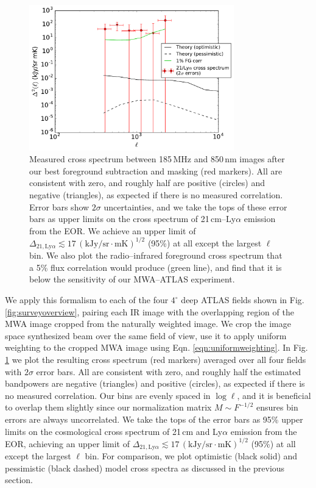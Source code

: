 \documentclass[numberedappendix]{emulateapj}
\begin{document}
\begin{figure}[h]
\centering
\includegraphics[width=3.5in]{images/mwa_atlas_xspec_with_2Dsimtheory_and_2sigma_errors_6bins.pdf}
\caption{Measured cross spectrum between 185\,MHz and 850\,nm images after our best foreground subtraction and masking (red markers). All are consistent with zero, and roughly half are positive (circles) and negative (triangles), as expected if there is no measured correlation. Error bars show $2\sigma$ uncertainties, and we take the tops of these error bars as upper limits on the cross spectrum of 21\,cm--Ly$\alpha$ emission from the EOR. We achieve an upper limit of $\Delta_{21,\text{Ly}\alpha}\lesssim17\,(\text{kJy/sr}\cdot \text{mK})^{1/2}$ (95\%) at all except the largest $\ell$ bin. We also plot the radio--infrared foreground cross spectrum that a 5\% flux correlation would produce (green line), and find that it is below the sensitivity of our MWA--ATLAS experiment.}
\label{fig:resxspec}
\end{figure}

We apply this formalism to each of the four $4^\circ$ deep ATLAS fields shown in Fig. \ref{fig:surveyoverview}, pairing each IR image with the overlapping region of the MWA image cropped from the naturally weighted image. We crop the image space synthesized beam over the same field of view, use it to apply uniform weighting to the cropped MWA image using Eqn. \ref{eqn:uniformweighting}. In Fig. \ref{fig:resxspec} we plot the resulting cross spectrum (red markers) averaged over all four fields with $2\sigma$ error bars. All are consistent with zero, and roughly half the estimated bandpowers are negative (triangles) and positive (circles), as expected if there is no measured correlation. Our bins are evenly spaced in $\log \ell$, and it is beneficial to overlap them slightly since our normalization matrix $M\sim F^{-1/2}$ ensures bin errors are always uncorrelated. We take the tops of the error bars as 95\% upper limits on the cosmological cross spectrum of 21\,cm and Ly$\alpha$ emission from the EOR, achieving an upper limit of $\Delta_{21,\text{Ly}\alpha}\lesssim17\,(\text{kJy/sr}\cdot \text{mK})^{1/2}$ (95\%) at all except the largest $\ell$ bin. For comparison, we plot optimistic (black solid) and pessimistic (black dashed) model cross spectra as discussed in the previous section.
 
\end{document}

